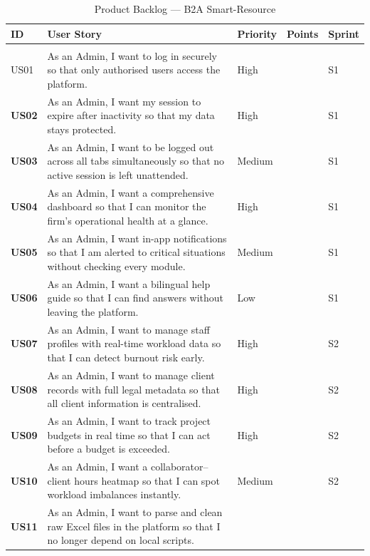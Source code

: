\documentclass[12pt,a4paper]{report}
\begin{document}
\begin{longtable}{>{\bfseries}p{1.1cm} p{6.8cm} >{\centering\arraybackslash}p{1.6cm}
                  >{\centering\arraybackslash}p{1.4cm} >{\centering\arraybackslash}p{1.2cm}}
  \caption{Product Backlog --- B2A Smart-Resource}\label{tab:backlog}\\
  \toprule
  \textbf{ID} & \textbf{User Story} & \textbf{Priority} & \textbf{Points} & \textbf{Sprint}\\
  \midrule\endhead
  \midrule\multicolumn{5}{r}{\small\itshape Continued\ldots}\\\endfoot
  \bottomrule\endlastfoot

  US01 & As an Admin, I want to log in securely so that only authorised users access the platform.
        & High & 5 & S1\\[3pt]
  US02 & As an Admin, I want my session to expire after inactivity so that my data stays protected.
        & High & 3 & S1\\[3pt]
  US03 & As an Admin, I want to be logged out across all tabs simultaneously so that no active session is left unattended.
        & Medium & 3 & S1\\[3pt]
  US04 & As an Admin, I want a comprehensive dashboard so that I can monitor the firm's operational health at a glance.
        & High & 13 & S1\\[3pt]
  US05 & As an Admin, I want in-app notifications so that I am alerted to critical situations without checking every module.
        & Medium & 5 & S1\\[3pt]
  US06 & As an Admin, I want a bilingual help guide so that I can find answers without leaving the platform.
        & Low & 3 & S1\\[3pt]
  US07 & As an Admin, I want to manage staff profiles with real-time workload data so that I can detect burnout risk early.
        & High & 8 & S2\\[3pt]
  US08 & As an Admin, I want to manage client records with full legal metadata so that all client information is centralised.
        & High & 5 & S2\\[3pt]
  US09 & As an Admin, I want to track project budgets in real time so that I can act before a budget is exceeded.
        & High & 8 & S2\\[3pt]
  US10 & As an Admin, I want a collaborator--client hours heatmap so that I can spot workload imbalances instantly.
        & Medium & 5 & S2\\[3pt]
  US11 & As an Admin, I want to parse and clean raw Excel files in the platform so that I no longer depend on local scripts.

\end{longtable}
\end{document}
